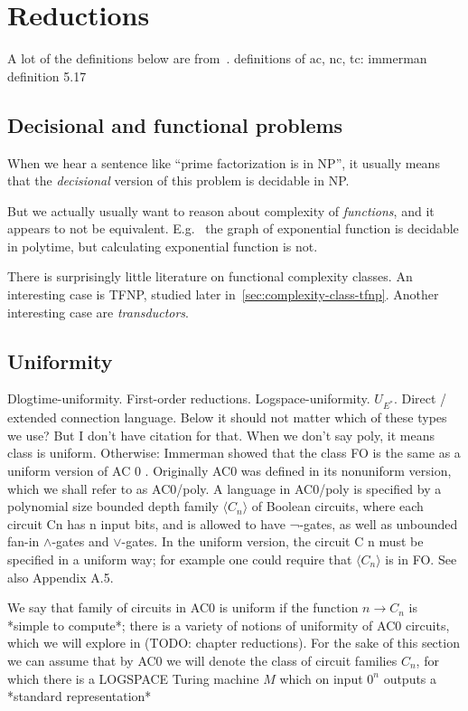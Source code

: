 \chapter{Reductions}
\label{chap:reductions}
A lot of the definitions below are from~\cite{10.5555/520668}.
definitions of ac, nc, tc:
immerman definition 5.17




\section{Decisional and functional problems}
When we hear a sentence like ``prime factorization is in NP'', it usually
means that the \emph{decisional} version of this problem is decidable in NP.

But we actually usually want to reason about complexity of \emph{functions},
and it appears to not be equivalent. E.g. \ the graph of exponential function is 
decidable in polytime, but calculating exponential function is not.

There is surprisingly little literature on functional complexity classes.
An interesting case is TFNP, studied later in~\ref{sec:complexity-class-tfnp}.
Another interesting case are \emph{transductors}.

\section{Uniformity}
Dlogtime-uniformity. First-order reductions. Logspace-uniformity. $U_{E^*}$. Direct / extended connection language.
Below it should not matter which of these types we use? But I don't have citation for that.
When we don't say poly, it means class is uniform. Otherwise: Immerman showed that the class FO is the same as a uniform version
of AC 0 . Originally AC0 was defined in its nonuniform version, which
we shall refer to as AC0/poly. A language in AC0/poly is specified by
a polynomial size bounded depth family $\langle C_n \rangle$ of Boolean circuits, where
each circuit Cn has n input bits, and is allowed to have ¬-gates, as well as
unbounded fan-in $\land$-gates and $\lor$-gates. In the uniform version, the circuit
C n must be specified in a uniform way; for example one could require that
$\langle C_n \rangle$ is in FO\@. See also Appendix A.5.

We say that family of circuits in AC0 is uniform if the function $n \rightarrow C_n$ is
 *simple to compute*; there is a variety of notions of uniformity of AC0 circuits, which
  we will explore in (TODO: chapter reductions). For the sake of this section we can assume
   that by AC0 we will denote the class of circuit families $C_n$, for which there is a 
   LOGSPACE Turing machine $M$ which on input $0^n$ outputs a *standard representation*


